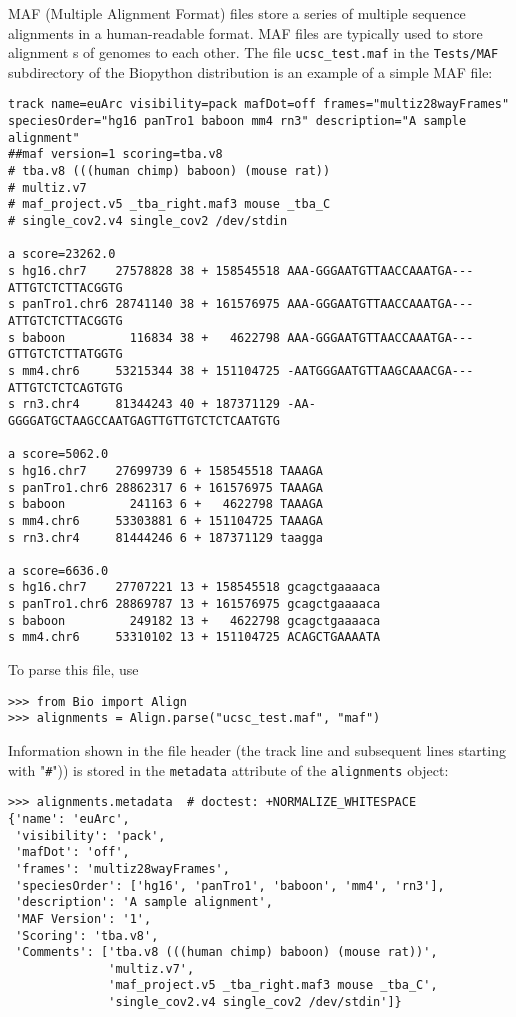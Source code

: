 MAF (Multiple Alignment Format) files store a series of multiple sequence alignments in a human-readable format. MAF files are typically used to store alignment
s of genomes to each other. The file \verb|ucsc_test.maf| in the \verb|Tests/MAF| subdirectory of the Biopython distribution is an example of a simple MAF file:
\begin{verbatim}
track name=euArc visibility=pack mafDot=off frames="multiz28wayFrames" speciesOrder="hg16 panTro1 baboon mm4 rn3" description="A sample alignment"
##maf version=1 scoring=tba.v8
# tba.v8 (((human chimp) baboon) (mouse rat))
# multiz.v7
# maf_project.v5 _tba_right.maf3 mouse _tba_C
# single_cov2.v4 single_cov2 /dev/stdin

a score=23262.0
s hg16.chr7    27578828 38 + 158545518 AAA-GGGAATGTTAACCAAATGA---ATTGTCTCTTACGGTG
s panTro1.chr6 28741140 38 + 161576975 AAA-GGGAATGTTAACCAAATGA---ATTGTCTCTTACGGTG
s baboon         116834 38 +   4622798 AAA-GGGAATGTTAACCAAATGA---GTTGTCTCTTATGGTG
s mm4.chr6     53215344 38 + 151104725 -AATGGGAATGTTAAGCAAACGA---ATTGTCTCTCAGTGTG
s rn3.chr4     81344243 40 + 187371129 -AA-GGGGATGCTAAGCCAATGAGTTGTTGTCTCTCAATGTG

a score=5062.0
s hg16.chr7    27699739 6 + 158545518 TAAAGA
s panTro1.chr6 28862317 6 + 161576975 TAAAGA
s baboon         241163 6 +   4622798 TAAAGA
s mm4.chr6     53303881 6 + 151104725 TAAAGA
s rn3.chr4     81444246 6 + 187371129 taagga

a score=6636.0
s hg16.chr7    27707221 13 + 158545518 gcagctgaaaaca
s panTro1.chr6 28869787 13 + 161576975 gcagctgaaaaca
s baboon         249182 13 +   4622798 gcagctgaaaaca
s mm4.chr6     53310102 13 + 151104725 ACAGCTGAAAATA

\end{verbatim}
To parse this file, use
\begin{verbatim}
>>> from Bio import Align
>>> alignments = Align.parse("ucsc_test.maf", "maf")
\end{verbatim}
Information shown in the file header (the track line and subsequent lines starting with "\verb|#|")) is stored in the \verb|metadata| attribute of the \verb|alignments| object:
\begin{verbatim}
>>> alignments.metadata  # doctest: +NORMALIZE_WHITESPACE
{'name': 'euArc',
 'visibility': 'pack',
 'mafDot': 'off',
 'frames': 'multiz28wayFrames',
 'speciesOrder': ['hg16', 'panTro1', 'baboon', 'mm4', 'rn3'],
 'description': 'A sample alignment',
 'MAF Version': '1',
 'Scoring': 'tba.v8',
 'Comments': ['tba.v8 (((human chimp) baboon) (mouse rat))',
              'multiz.v7',
              'maf_project.v5 _tba_right.maf3 mouse _tba_C',
              'single_cov2.v4 single_cov2 /dev/stdin']}
\end{verbatim}
